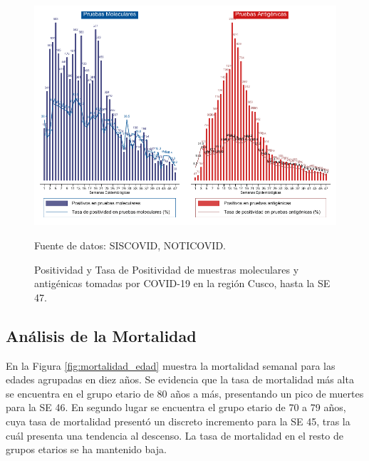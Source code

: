 \documentclass[12pt,a4paper,openany]{book}
\begin{document}
\begin{landscape}
   \begin{figure}[h]
	\caption{Positividad y Tasa de Positividad de muestras moleculares y antigénicas tomadas por COVID-19 en la región Cusco, hasta la SE 47. }\label{fig:positividad_ambas}
   	\begin{center}
   		\includegraphics[width=0.85\linewidth]{../figuras/positividad_ambas.pdf}
   	\end{center}
   	{\footnotesize {Fuente de datos: SISCOVID, NOTICOVID.}}
   \end{figure}
\end{landscape}
\clearpage

	\subsection*{Análisis de la Mortalidad}

	\noindent En la Figura \ref{fig:mortalidad_edad} muestra la mortalidad semanal para las edades agrupadas en diez años. Se evidencia que la tasa de mortalidad más alta se encuentra en el grupo etario de 80 años a más, presentando un pico de muertes para la SE 46. En segundo lugar se encuentra el grupo etario de 70 a 79 años, cuya tasa de mortalidad presentó un discreto incremento para la SE 45, tras la cuál presenta una tendencia al descenso. La tasa de mortalidad en el resto de grupos etarios se ha mantenido baja.
	
\end{document}
